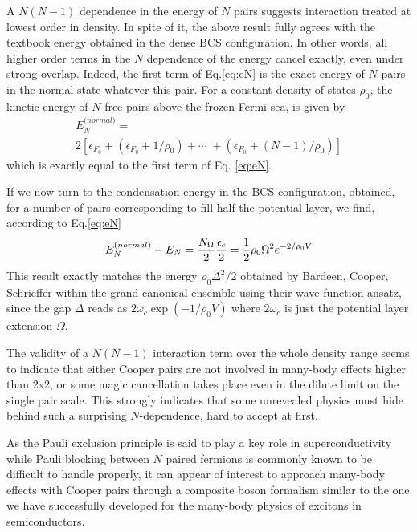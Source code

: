 \documentclass[epj]{svjour}
\begin{document}
A $N(N-1)$ dependence in the energy of $N$ pairs suggests interaction treated at lowest order in density. In spite of it, the above result fully agrees with the textbook energy obtained in the dense BCS configuration. In other words, all higher order terms in the $N$ dependence of the energy cancel exactly, even under strong overlap.  Indeed, the first term of Eq.\eqref{eq:eN} is
the exact energy of $N$ pairs in the normal state whatever this pair. For a constant density of states $\rho _{0}$, the kinetic energy of $N$ free pairs above the frozen Fermi sea, is given by
\begin{multline}
{E}_{N}^{\text{(}normal)}= \\
2\left[\epsilon _{F_{0}}+\left( \epsilon _{F_{0}}+1/\rho _{0}\right) +\cdots
\;+\left( \epsilon _{F_{0}}+(N-1)/\rho _{0}\right)\right]
\end{multline}%
which is exactly equal to the first term of Eq. \eqref{eq:eN}.

If we now turn to the condensation energy in the BCS configuration, obtained, for a number of pairs corresponding to fill half the potential layer, we find,  according to Eq.\eqref{eq:eN}  
\begin{equation}
{E}_{N}^{\text{(}normal)}-{E}_{N}=\frac{N_{\Omega }}{2}\frac{%
\epsilon _{c}}{2}=\frac{1}{2}\rho _{0}\Omega ^{2}e^{-2/\rho _{0}V}
\end{equation}%
This result exactly matches the energy  $\rho _{0}\Delta ^{2}/2$ obtained by Bardeen, Cooper, Schrieffer within the grand canonical
ensemble using their wave function ansatz, since the gap $\Delta $ reads as $%
2\omega _{c}\exp \left( -1/\rho _{0}V\right) $ where $2\omega _{c}$ is just the
potential layer extension $\Omega $. 

The validity of a $N(N-1)$ interaction term over the whole density range seems to indicate that either Cooper pairs are not involved in many-body effects higher than 2x2, or some magic cancellation takes place even in the dilute limit on the single pair scale. This strongly indicates that some unrevealed physics must hide behind such a  surprising $N$-dependence, hard to accept at first. 

As the Pauli exclusion principle is said to play a key role in superconductivity while Pauli blocking between $N$ paired fermions is commonly known to be difficult to handle properly, it can appear of interest to approach many-body effects with Cooper pairs through a composite boson formalism similar to the one we have successfully developed for the many-body physics of excitons in semiconductors\cite
{CobosonPhysicsReports}.
\end{document}
